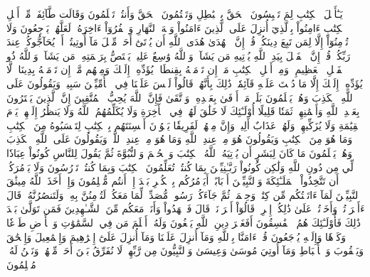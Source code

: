 يَـٰٓأَهۡلَ ٱلۡكِتَٰبِ لِمَ تَلۡبِسُونَ ٱلۡحَقَّ بِٱلۡبَٰطِلِ وَتَكۡتُمُونَ ٱلۡحَقَّ وَأَنتُمۡ تَعۡلَمُونَ
وَقَالَت طَّآئِفَةٞ مِّنۡ أَهۡلِ ٱلۡكِتَٰبِ ءَامِنُواْ بِٱلَّذِيٓ أُنزِلَ عَلَى ٱلَّذِينَ ءَامَنُواْ وَجۡهَ ٱلنَّهَارِ وَٱكۡفُرُوٓاْ ءَاخِرَهُۥ لَعَلَّهُمۡ يَرۡجِعُونَ
وَلَا تُؤۡمِنُوٓاْ إِلَّا لِمَن تَبِعَ دِينَكُمۡ قُلۡ إِنَّ ٱلۡهُدَىٰ هُدَى ٱللَّهِ أَن يُؤۡتَىٰٓ أَحَدٞ مِّثۡلَ مَآ أُوتِيتُمۡ أَوۡ يُحَآجُّوكُمۡ عِندَ رَبِّكُمۡۗ قُلۡ إِنَّ ٱلۡفَضۡلَ بِيَدِ ٱللَّهِ يُؤۡتِيهِ مَن يَشَآءُۗ وَٱللَّهُ وَٰسِعٌ عَلِيمٞ
يَخۡتَصُّ بِرَحۡمَتِهِۦ مَن يَشَآءُۗ وَٱللَّهُ ذُو ٱلۡفَضۡلِ ٱلۡعَظِيمِ
۞وَمِنۡ أَهۡلِ ٱلۡكِتَٰبِ مَنۡ إِن تَأۡمَنۡهُ بِقِنطَارٖ يُؤَدِّهِۦٓ إِلَيۡكَ وَمِنۡهُم مَّنۡ إِن تَأۡمَنۡهُ بِدِينَارٖ لَّا يُؤَدِّهِۦٓ إِلَيۡكَ إِلَّا مَا دُمۡتَ عَلَيۡهِ قَآئِمٗاۗ ذَٰلِكَ بِأَنَّهُمۡ قَالُواْ لَيۡسَ عَلَيۡنَا فِي ٱلۡأُمِّيِّـۧنَ سَبِيلٞ وَيَقُولُونَ عَلَى ٱللَّهِ ٱلۡكَذِبَ وَهُمۡ يَعۡلَمُونَ
بَلَىٰۚ مَنۡ أَوۡفَىٰ بِعَهۡدِهِۦ وَٱتَّقَىٰ فَإِنَّ ٱللَّهَ يُحِبُّ ٱلۡمُتَّقِينَ
إِنَّ ٱلَّذِينَ يَشۡتَرُونَ بِعَهۡدِ ٱللَّهِ وَأَيۡمَٰنِهِمۡ ثَمَنٗا قَلِيلًا أُوْلَـٰٓئِكَ لَا خَلَٰقَ لَهُمۡ فِي ٱلۡأٓخِرَةِ وَلَا يُكَلِّمُهُمُ ٱللَّهُ وَلَا يَنظُرُ إِلَيۡهِمۡ يَوۡمَ ٱلۡقِيَٰمَةِ وَلَا يُزَكِّيهِمۡ وَلَهُمۡ عَذَابٌ أَلِيمٞ
وَإِنَّ مِنۡهُمۡ لَفَرِيقٗا يَلۡوُۥنَ أَلۡسِنَتَهُم بِٱلۡكِتَٰبِ لِتَحۡسَبُوهُ مِنَ ٱلۡكِتَٰبِ وَمَا هُوَ مِنَ ٱلۡكِتَٰبِ وَيَقُولُونَ هُوَ مِنۡ عِندِ ٱللَّهِ وَمَا هُوَ مِنۡ عِندِ ٱللَّهِۖ وَيَقُولُونَ عَلَى ٱللَّهِ ٱلۡكَذِبَ وَهُمۡ يَعۡلَمُونَ
مَا كَانَ لِبَشَرٍ أَن يُؤۡتِيَهُ ٱللَّهُ ٱلۡكِتَٰبَ وَٱلۡحُكۡمَ وَٱلنُّبُوَّةَ ثُمَّ يَقُولَ لِلنَّاسِ كُونُواْ عِبَادٗا لِّي مِن دُونِ ٱللَّهِ وَلَٰكِن كُونُواْ رَبَّـٰنِيِّـۧنَ بِمَا كُنتُمۡ تُعَلِّمُونَ ٱلۡكِتَٰبَ وَبِمَا كُنتُمۡ تَدۡرُسُونَ
وَلَا يَأۡمُرَكُمۡ أَن تَتَّخِذُواْ ٱلۡمَلَـٰٓئِكَةَ وَٱلنَّبِيِّـۧنَ أَرۡبَابًاۚ أَيَأۡمُرُكُم بِٱلۡكُفۡرِ بَعۡدَ إِذۡ أَنتُم مُّسۡلِمُونَ
وَإِذۡ أَخَذَ ٱللَّهُ مِيثَٰقَ ٱلنَّبِيِّـۧنَ لَمَآ ءَاتَيۡتُكُم مِّن كِتَٰبٖ وَحِكۡمَةٖ ثُمَّ جَآءَكُمۡ رَسُولٞ مُّصَدِّقٞ لِّمَا مَعَكُمۡ لَتُؤۡمِنُنَّ بِهِۦ وَلَتَنصُرُنَّهُۥۚ قَالَ ءَأَقۡرَرۡتُمۡ وَأَخَذۡتُمۡ عَلَىٰ ذَٰلِكُمۡ إِصۡرِيۖ قَالُوٓاْ أَقۡرَرۡنَاۚ قَالَ فَٱشۡهَدُواْ وَأَنَا۠ مَعَكُم مِّنَ ٱلشَّـٰهِدِينَ
فَمَن تَوَلَّىٰ بَعۡدَ ذَٰلِكَ فَأُوْلَـٰٓئِكَ هُمُ ٱلۡفَٰسِقُونَ
أَفَغَيۡرَ دِينِ ٱللَّهِ يَبۡغُونَ وَلَهُۥٓ أَسۡلَمَ مَن فِي ٱلسَّمَٰوَٰتِ وَٱلۡأَرۡضِ طَوۡعٗا وَكَرۡهٗا وَإِلَيۡهِ يُرۡجَعُونَ
قُلۡ ءَامَنَّا بِٱللَّهِ وَمَآ أُنزِلَ عَلَيۡنَا وَمَآ أُنزِلَ عَلَىٰٓ إِبۡرَٰهِيمَ وَإِسۡمَٰعِيلَ وَإِسۡحَٰقَ وَيَعۡقُوبَ وَٱلۡأَسۡبَاطِ وَمَآ أُوتِيَ مُوسَىٰ وَعِيسَىٰ وَٱلنَّبِيُّونَ مِن رَّبِّهِمۡ لَا نُفَرِّقُ بَيۡنَ أَحَدٖ مِّنۡهُمۡ وَنَحۡنُ لَهُۥ مُسۡلِمُونَ
